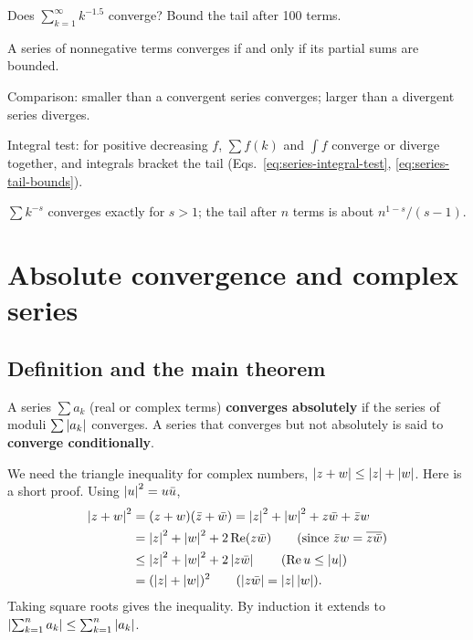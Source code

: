 \begin{checkpoint}
Does $\sum_{k=1}^\infty k^{-1.5}$ converge? Bound the tail after 100 terms.
\end{checkpoint}

\begin{keyideas}
\item A series of nonnegative terms converges if and only if its partial sums are bounded.
\item Comparison: smaller than a convergent series converges; larger than a divergent series diverges.
\item Integral test: for positive decreasing $f$, $\sum f(k)$ and $\int f$ converge or diverge together, and integrals bracket the tail (Eqs.~\eqref{eq:series-integral-test}, \eqref{eq:series-tail-bounds}).
\item $\sum k^{-s}$ converges exactly for $s>1$; the tail after $n$ terms is about $n^{1-s}/(s-1)$.
\end{keyideas}

\section{Absolute convergence and complex series}\label{sec:series-absolute}

\subsection{Definition and the main theorem}

A series $\sum a_k$ (real or complex terms) \textbf{converges absolutely} if the series of moduli $\sum\left\lvert a_k\right\rvert$ converges. A series that converges but not absolutely is said to \textbf{converge conditionally}.

We need the triangle inequality for complex numbers, $\left\lvert z+w\right\rvert\le\left\lvert z\right\rvert+\left\lvert w\right\rvert$. Here is a short proof. Using $\left\lvert u\right\rvert^2=u\bar u$,
\begin{align*}
\left\lvert z+w\right\rvert^2&=(z+w)(\bar z+\bar w)=\left\lvert z\right\rvert^2+\left\lvert w\right\rvert^2+z\bar w+\bar zw\\
&=\left\lvert z\right\rvert^2+\left\lvert w\right\rvert^2+2\operatorname{Re}(z\bar w)\qquad(\text{since } \bar zw=\overline{z\bar w})\\
&\le\left\lvert z\right\rvert^2+\left\lvert w\right\rvert^2+2\left\lvert z\bar w\right\rvert\qquad(\operatorname{Re} u\le\left\lvert u\right\rvert)\\
&=(\left\lvert z\right\rvert+\left\lvert w\right\rvert)^2\qquad(\left\lvert z\bar w\right\rvert=\left\lvert z\right\rvert\left\lvert w\right\rvert).
\end{align*}
Taking square roots gives the inequality. By induction it extends to $\left\lvert \sum_{k=1}^na_k\right\rvert\le\sum_{k=1}^n\left\lvert a_k\right\rvert$.

